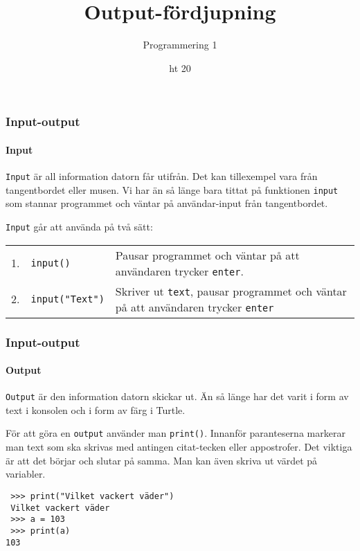 \documentclass{beamer}
\begin{document}

\title{Output-fördjupning}
\date{ht 20}
\author{Programmering 1}

\maketitle

\begin{frame}
\frametitle{Input-output}
\framesubtitle{Input}

\texttt{Input} är all information datorn får utifrån. Det kan tillexempel vara från tangentbordet eller musen. Vi har än så länge bara tittat på funktionen \texttt{input} som stannar programmet och väntar på användar-input från tangentbordet.

\texttt{Input} går att använda på två sätt:
\begin{center}
\begin{tabular}{llp{6cm}}
1. & \texttt{input()} & Pausar programmet och väntar på att användaren trycker \texttt{enter}.\\
2. & \texttt{input("Text")} & Skriver ut \texttt{text}, pausar programmet och väntar på att användaren trycker \texttt{enter}
\end{tabular}
\end{center}

\end{frame}

\begin{frame}[fragile]
\frametitle{Input-output}
\framesubtitle{Output}

 \texttt{Output} är den information datorn skickar ut. Än så länge har det varit i form av text i konsolen och i form av färg i Turtle.
 
 För att göra en \texttt{output} använder man \texttt{print()}. Innanför paranteserna markerar man text som ska skrivas med antingen citat-tecken eller appostrofer. Det viktiga är att det börjar och slutar på samma. Man kan även skriva ut värdet på variabler.
 
 \begin{lstlisting}
 >>> print("Vilket vackert väder")
 Vilket vackert väder
 >>> a = 103
 >>> print(a)
103
 \end{lstlisting}

\end{frame}
\end{document}
